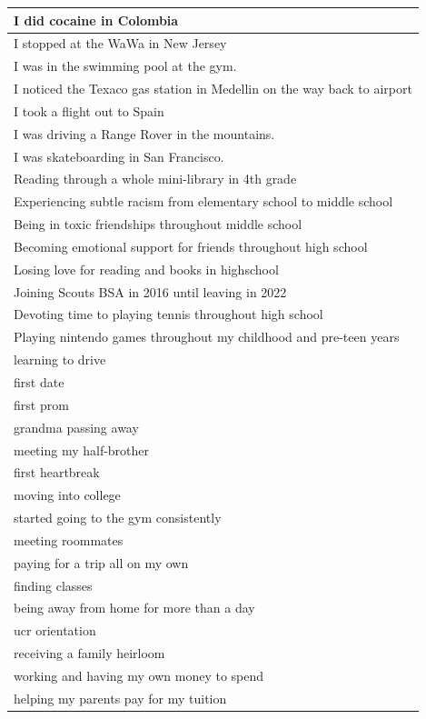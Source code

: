 \documentclass[
  .7em,
  letterpaper,
  DIV=11,
  numbers=noendperiod]{scrartcl}
\begin{document}
\begin{table}
\begin{tabular}{l}
\hline
I did cocaine in Colombia\\
\hline
I stopped at the WaWa in New Jersey\\
\hline
I was in the swimming pool at the gym.\\
\hline
I noticed the Texaco gas station in Medellin on the way back to airport\\
\hline
I took a flight out to Spain\\
\hline
I was driving a Range Rover in the mountains.\\
\hline
I was skateboarding in San Francisco.\\
\hline
Reading through a whole mini-library in 4th grade\\
\hline
Experiencing subtle racism from elementary school to middle school\\
\hline
Being in toxic friendships throughout middle school\\
\hline
Becoming emotional support for friends throughout high school\\
\hline
Losing love for reading and books in highschool\\
\hline
Joining Scouts BSA in 2016 until leaving in 2022\\
\hline
Devoting time to playing tennis throughout high school\\
\hline
Playing nintendo games throughout my childhood and pre-teen years\\
\hline
learning to drive\\
\hline
first date\\
\hline
first prom\\
\hline
grandma passing away\\
\hline
meeting my half-brother\\
\hline
first heartbreak\\
\hline
moving into college\\
\hline
started going to the gym consistently\\
\hline
meeting roommates\\
\hline
paying for a trip all on my own\\
\hline
finding classes\\
\hline
being away from home for more than a day\\
\hline
ucr orientation\\
\hline
receiving a family heirloom\\
\hline
working and having my own money to spend\\
\hline
helping my parents pay for my tuition\\

\end{tabular}
\end{table}
\end{document}

